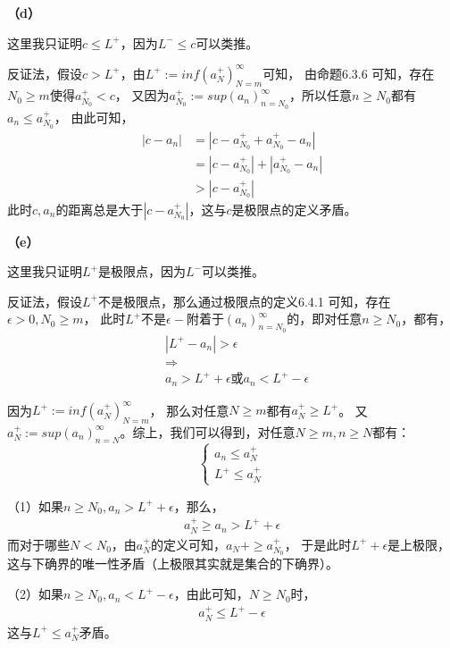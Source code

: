 \documentclass{article}
\theoremstyle{mystyle}
\begin{document}
\textbf{（d）}

这里我只证明$c \leq L^+$，因为$L^- \leq c$可以类推。

反证法，假设$c > L^+$，由$L^+ := inf(a_N^+)_{N=m}^\infty$可知，
由命题6.3.6 可知，存在$N_0 \geq m$使得$a_{N_0}^+ < c$，
又因为$a_{N_0}^+ := sup(a_n)_{n=N_0}^\infty$，所以任意$n \geq N_0$都有$a_n \leq a_{N_0}^+$，
由此可知，
\begin{align*}
  |c - a_n| & = |c - a_{N_0}^+ + a_{N_0}^+ - a_n|   \\
            & = |c - a_{N_0}^+| + |a_{N_0}^+ - a_n| \\
            & > |c - a_{N_0}^+|
\end{align*}
此时$c,a_n$的距离总是大于$|c - a_{N_0}^+|$，这与$c$是极限点的定义矛盾。

\textbf{（e）}

这里我只证明$L^+$是极限点，因为$L^-$可以类推。

反证法，假设$L^+$不是极限点，那么通过极限点的定义6.4.1 可知，存在$\epsilon > 0, N_0 \geq m$，
此时$L^+$不是$\epsilon -$附着于$(a_n)_{n=N_0}^\infty$的，即对任意$n \geq N_0$，都有，
\begin{align*}
   & |L^+ - a_n| > \epsilon                             \\
   & \Rightarrow                                        \\
   & a_n > L^+ + \epsilon \text{或} a_n < L^+ - \epsilon
\end{align*}

因为$L^+ := inf(a_N^+)_{N=m}^\infty$，
那么对任意$N \geq m$都有$a_N^+ \geq L^+$。
又$a_N^+ := sup(a_n)_{n=N}^\infty$。综上，我们可以得到，对任意$N \geq m, n \geq N$都有：
\begin{equation}
  \begin{cases*}
    a_n \leq a_N^+ \\
    L^+ \leq a_N^+
  \end{cases*}
\end{equation}

（1）如果$n \geq N_0, a_n > L^+ + \epsilon$，那么，
\begin{align*}
  a_N^+ \geq a_n > L^+ + \epsilon
\end{align*}
而对于哪些$N < N_0$，由$a_N^+$的定义可知，$a_N+ \geq a_{N_0}^+$，
于是此时$L^+ + \epsilon$是上极限，这与下确界的唯一性矛盾（上极限其实就是集合的下确界）。

（2）如果$n \geq N_0, a_n < L^+ - \epsilon$，由此可知，$N \geq N_0$时，
\begin{align*}
  a_N^+ \leq L^+ - \epsilon
\end{align*}
这与$L^+ \leq a_N^+$矛盾。
\end{document}
